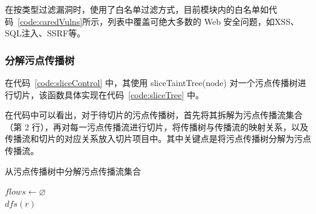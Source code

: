 在按类型过滤漏洞时，使用了白名单过滤方式，目前模块内的白名单如代码~\ref{code:caredVulns}所示，列表中覆盖可绝大多数的 Web 安全问题，如XSS、SQL注入、SSRF等。

\subsubsection{分解污点传播树}

在代码~\ref{code:sliceControl} 中，其使用 sliceTaintTree(node) 对一个污点传播树进行切片，该函数具体实现在代码~\ref{code:sliceTree} 中。\\
\begin{minipage}{0.9\textwidth}
    
\end{minipage}
 
 在代码中可以看出，对于待切片的污点传播树，首先将其拆解为污点传播流集合（第 2 行），再对每一污点传播流进行切片，将传播树与传播流的映射关系，以及传播流和切片的对应关系放入切片项目中。其中关键点是将污点传播树分解为污点传播流。
 
 \begin{algorithm}[!htb]\footnotesize
     \caption{从污点传播树中分解污点传播流集合}
     \label{alg:getTaintFlows}
     $flows \leftarrow \varnothing$\\
     $dfs(r)$\\
 \end{algorithm}

